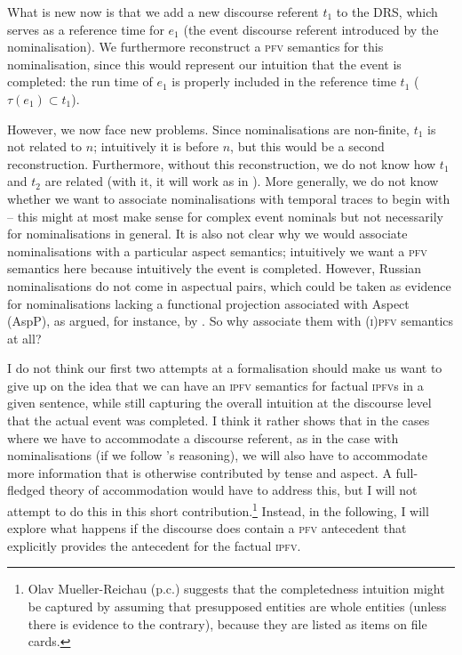 \documentclass[output=paper]{langscibook}
\begin{document}
\ea[] {$[e_1, e_2, t_1, t_2, n, x\,|\,\textsc{payment}(e_1), \textsc{pay}(e_2), \cnst{theme}(e_2, x),$\\ $\textsc{6,000R}(x), \textsc{in-cash}(e_2), e_2 = e_1, \tau(e_1) \subset t_1, t_2 \subset \tau(e_2), t_2 < n]$}\label{gehr:ex:try2}
\z 

\noindent What is new now is that we add a new discourse referent $t_1$ to the DRS, which serves as a reference time for $e_1$ (the event discourse referent introduced by the nominalisation). We furthermore reconstruct a \textsc{pfv} semantics for this nominalisation, since this would represent our intuition that the event is completed: the run time of $e_1$ is properly included in the reference time $t_1$ ($\tau(e_1) \subset t_1$). 

However, we now face new problems. Since nominalisations are non-finite, $t_1$ is not related to $n$; intuitively it is before $n$, but this would be a second reconstruction. Furthermore, without this reconstruction, we do not know how $t_1$ and $t_2$ are related (with it, it will work as in ). More generally, we do not know whether we want to associate nominalisations with temporal traces to begin with -- this might at most make sense for complex event nominals \citep[in the sense of][]{grimshaw90} but not necessarily for nominalisations in general. It is also not clear why we would associate nominalisations with a particular aspect semantics; intuitively we want a \textsc{pfv} semantics here because intuitively the event is completed. However, Russian nominalisations do not come in aspectual pairs, which could be taken as evidence for nominalisations lacking a functional projection associated with Aspect (AspP), as argued, for instance, by \citet{schoorlemmer95}. So why associate them with \textsc{(i)pfv} semantics at all? 

I do not think our first two attempts at a formalisation should make us want to give up on the idea that we can have an \textsc{ipfv} semantics for factual \textsc{ipfv}s in a given sentence, while still capturing the overall intuition at the discourse level that the actual event was completed. I think it rather shows that in the cases where we have to accommodate a discourse referent, as in the case with nominalisations (if we follow \citeauthor{gronndiss}'s \citeyear{gronndiss} reasoning), we will also have to accommodate more information that is otherwise contributed by tense and aspect. A full-fledged theory of accommodation would have to address this, but I will not attempt to do this in this short contribution.\footnote{Olav Mueller-Reichau (p.c.) suggests that the completedness intuition might be captured by assuming that presupposed entities are whole entities (unless there is evidence to the contrary), because they are listed as items on file cards.} Instead, in the following, I will explore what happens if the discourse does contain a \textsc{pfv} antecedent that explicitly provides the antecedent for the factual \textsc{ipfv}. 
\end{document}
